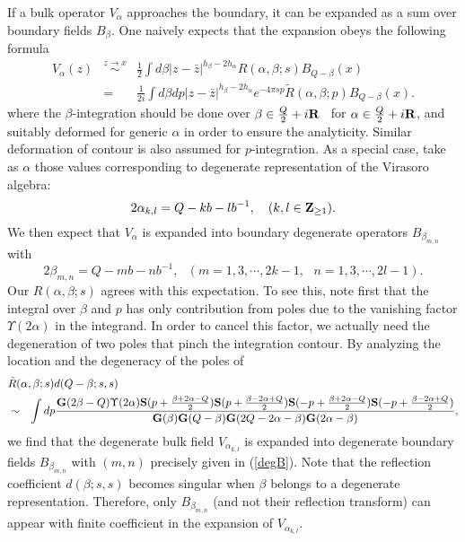 \documentclass[a4paper,11pt]{article}
\newcommand{\tfrac}[2]{{\textstyle\frac{#1}{#2}}}
\newcommand{\bS}{{\bf S}}
\newcommand{\bG}{{\bf G}}
\begin{document}
   If a bulk operator $V_\alpha$ approaches the boundary, it can be
 expanded as a sum over boundary fields $B_\beta$.
 One naively expects that the expansion obeys the following formula
\begin{eqnarray}
  V_{\alpha}(z)&\stackrel{z\rightarrow x}{\sim}&
  \tfrac{1}{2} \int d\beta
  |z-\bar{z}|^{h_\beta-2h_\alpha} R(\alpha,\beta;s)B_{Q-\beta}(x)
    \nonumber \\ &=&
  \tfrac{1}{2i}\int d\beta dp
  |z-\bar{z}|^{h_\beta-2h_\alpha} e^{-4\pi sp}
  \tilde{R}(\alpha,\beta;p)B_{Q-\beta}(x).
\label{VBexp}
\end{eqnarray}
 where the $\beta$-integration should be done over 
 $\beta\in \frac{Q}{2}+i{\bf R}$~ for $\alpha\in \frac{Q}{2}+i{\bf R}$,
 and suitably deformed for generic $\alpha$ in order to
 ensure the analyticity.
 Similar deformation of contour is also assumed for $p$-integration.
 As a special case, take as $\alpha$ those values corresponding to
 degenerate representation of the Virasoro algebra:
\begin{equation}
  2\alpha_{k,l}=Q-kb-lb^{-1},~~~(k,l\in {\bf Z}_{\ge 1}).
\end{equation}
 We then expect that $V_\alpha$ is expanded into boundary degenerate
 operators $B_{\beta_{m,n}}$ with
\begin{equation}
  2\beta_{m,n}=Q-mb-nb^{-1},~~~
 (m = 1,3,\cdots, 2k-1,~~~
  n = 1,3,\cdots, 2l-1).
\label{degB}
\end{equation}
 Our $R(\alpha,\beta;s)$ agrees with this expectation.
 To see this, note first that the integral over $\beta$ and $p$
 has only contribution from poles due to the vanishing factor
 $\Upsilon(2\alpha)$ in the integrand.
 In order to cancel this factor, we actually need
 the degeneration of two poles that pinch the integration contour.
 By analyzing the location and the degeneracy of the poles of
\begin{eqnarray}
\lefteqn{  \tilde{R}(\alpha,\beta;s)d(Q-\beta;s,s) } \nonumber \\
 &\sim& \int dp
            \frac{\bG(2\beta-Q)\Upsilon(2\alpha)
            \bS( p+\tfrac{\beta+2\alpha-Q}{2})
            \bS( p+\tfrac{\beta-2\alpha+Q}{2})
            \bS(-p+\tfrac{\beta+2\alpha-Q}{2})
            \bS(-p+\tfrac{\beta-2\alpha+Q}{2})}
           {\bG(\beta)\bG(Q-\beta)\bG(2Q-2\alpha-\beta)\bG(2\alpha-\beta)},
\end{eqnarray}
 we find that the degenerate bulk field $V_{\alpha_{k,l}}$
 is expanded into degenerate boundary fields $B_{\beta_{m,n}}$
 with $(m,n)$ precisely given in (\ref{degB}).
 Note that the reflection coefficient $d(\beta;s,s)$ becomes singular
 when $\beta$ belongs to a degenerate representation.
 Therefore, only $B_{\beta_{m,n}}$ (and not their reflection transform)
 can appear with finite coefficient in the expansion of $V_{\alpha_{k,l}}$.
\end{document}
